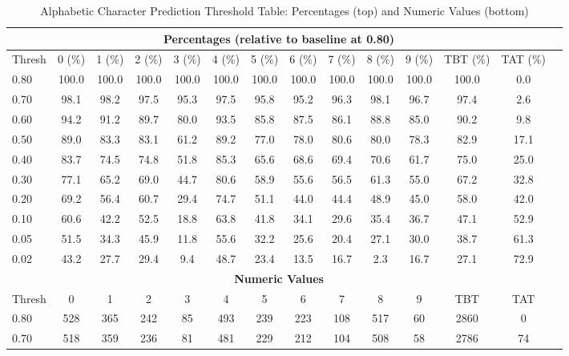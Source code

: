 \begin{table}[ht]
\centering
\caption{Alphabetic Character Prediction Threshold Table: Percentages (top) and Numeric Values (bottom)}
\label{tab:combined}
\scriptsize
\begin{tabular}{lccccccccccccc}
\toprule
\multicolumn{13}{c}{\textbf{Percentages (relative to baseline at 0.80)}} \\
\midrule
Thresh & 0 (\%) & 1 (\%) & 2 (\%) & 3 (\%) & 4 (\%) & 5 (\%) & 6 (\%) & 7 (\%) & 8 (\%) & 9 (\%) & TBT (\%) & TAT (\%) \\
\midrule
0.80   & 100.0  & 100.0  & 100.0  & 100.0  & 100.0  & 100.0  & 100.0  & 100.0  & 100.0  & 100.0  & 100.0   & 0.0   \\
0.70   & 98.1   & 98.2   & 97.5   & 95.3   & 97.5   & 95.8   & 95.2   & 96.3   & 98.1   & 96.7   & 97.4    & 2.6   \\
0.60   & 94.2   & 91.2   & 89.7   & 80.0   & 93.5   & 85.8   & 87.5   & 86.1   & 88.8   & 85.0   & 90.2    & 9.8   \\
0.50   & 89.0   & 83.3   & 83.1   & 61.2   & 89.2   & 77.0   & 78.0   & 80.6   & 80.0   & 78.3   & 82.9    & 17.1  \\
0.40   & 83.7   & 74.5   & 74.8   & 51.8   & 85.3   & 65.6   & 68.6   & 69.4   & 70.6   & 61.7   & 75.0    & 25.0  \\
0.30   & 77.1   & 65.2   & 69.0   & 44.7   & 80.6   & 58.9   & 55.6   & 56.5   & 61.3   & 55.0   & 67.2    & 32.8  \\
0.20   & 69.2   & 56.4   & 60.7   & 29.4   & 74.7   & 51.1   & 44.0   & 44.4   & 48.9   & 45.0   & 58.0    & 42.0  \\
0.10   & 60.6   & 42.2   & 52.5   & 18.8   & 63.8   & 41.8   & 34.1   & 29.6   & 35.4   & 36.7   & 47.1    & 52.9  \\
0.05   & 51.5   & 34.3   & 45.9   & 11.8   & 55.6   & 32.2   & 25.6   & 20.4   & 27.1   & 30.0   & 38.7    & 61.3  \\
0.02   & 43.2   & 27.7   & 29.4   & 9.4    & 48.7   & 23.4   & 13.5   & 16.7   & 2.3    & 16.7   & 27.1    & 72.9  \\
\midrule
\multicolumn{13}{c}{\textbf{Numeric Values}} \\
\midrule
Thresh & 0 & 1 & 2 & 3 & 4 & 5 & 6 & 7 & 8 & 9 & TBT & TAT \\
\midrule
0.80   & 528 & 365 & 242 & 85  & 493 & 239 & 223 & 108 & 517 & 60  & 2860 & 0   \\
0.70   & 518 & 359 & 236 & 81  & 481 & 229 & 212 & 104 & 508 & 58  & 2786 & 74  \\

\end{tabular}
\end{table}
